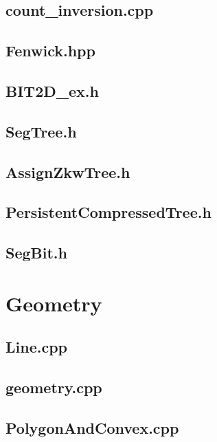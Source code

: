 \subsection{count\_inversion.cpp}

\subsection{Fenwick.hpp}

\subsection{BIT2D\_ex.h}

\subsection{SegTree.h}

\subsection{AssignZkwTree.h}

\subsection{PersistentCompressedTree.h}

\subsection{SegBit.h}

\section{Geometry}
\subsection{Line.cpp}

\subsection{geometry.cpp}

\subsection{PolygonAndConvex.cpp}

